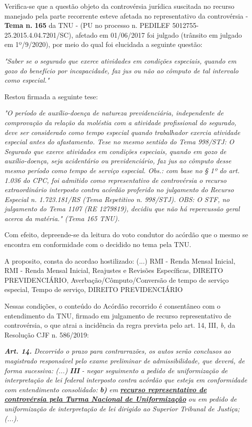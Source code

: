\documentclass[12pt]{article}
\begin{document}
\justifying
\noindent Verifica-se que a questão objeto da controvérsia jurídica suscitada no recurso manejado pela parte recorrente esteve afetada no representativo da controvérsia - \textbf{Tema n. }\textbf{165} da TNU - (PU no processo n. PEDILEF 5012755-25.2015.4.04.7201/SC),  afetado em 01/06/2017 foi julgado (trânsito em julgado em 1º/9/2020), por meio do qual foi elucidada a seguinte questão:

\noindent \textit{"Saber se o segurado que exerce atividades em condições especiais, quando em gozo do benefício por incapacidade, faz jus ou não ao cômputo de tal intervalo como especial."}

\noindent Restou firmada a seguinte tese:

\noindent \textit{"O período de auxílio-doença de natureza previdenciária, independente de comprovação da relação da moléstia com a atividade profissional do segurado, deve ser considerado como tempo especial quando trabalhador exercia atividade especial antes do afastamento. Tese no mesmo sentido do Tema 998/STJ: O Segurado que exerce atividades em condições especiais, quando em gozo de auxílio-doença, seja acidentário ou previdenciário, faz jus ao cômputo desse mesmo período como tempo de serviço especial. Obs.: com base no § 1º do art. 1.036 do CPC, foi admitido como representativo de controvérsia o recurso extraordinário interposto contra acórdão proferido no julgamento do Recurso Especial n. 1.723.181/RS (Tema Repetitivo n. 998/STJ). OBS: O STF, no julgamento do Tema 1107 (RE 1279819), decidiu que não há repercussão geral acerca da matéria." (Tema 165 TNU).}

\noindent Com efeito, depreende-se da leitura do voto condutor do acórdão que o mesmo se encontra em conformidade com o decidido no  tema pela TNU.

\noindent A proposito, consta do acordao hostilizado: (...) RMI - Renda Mensal Inicial, RMI - Renda Mensal Inicial, Reajustes e Revisões Específicas, DIREITO PREVIDENCIÁRIO, Averbação/Cômputo/Conversão de tempo de serviço especial, Tempo de serviço, DIREITO PREVIDENCIÁRIO

\noindent Nessas condições, o conteúdo do Acórdão recorrido é consentâneo com o entendimento da TNU, firmado em julgamento de recurso representativo de controvérsia, o que atrai a incidência da regra prevista pelo art. 14, III, \textit{b,} da Resolução CJF n. 586/2019:

\noindent \textit{\textbf{Art. 14.}}\textit{ Decorrido o prazo para contrarrazões, os autos serão conclusos ao magistrado responsável pelo exame preliminar de admissibilidade, que deverá, de forma sucessiva: (...) }\textit{\textbf{III }}\textit{- negar seguimento a pedido de uniformização de interpretação de lei federal interposto contra acórdão que esteja em conformidade com entendimento consolidado: }\textit{\textbf{b)}}\textit{ em }\uline{\textit{\textbf{recurso representativo de controvérsia pela Turma Nacional de Uniformização}}}\textit{ ou em pedido de uniformização de interpretação de lei dirigido ao Superior Tribunal de Justiça;(...).}
\end{document}

